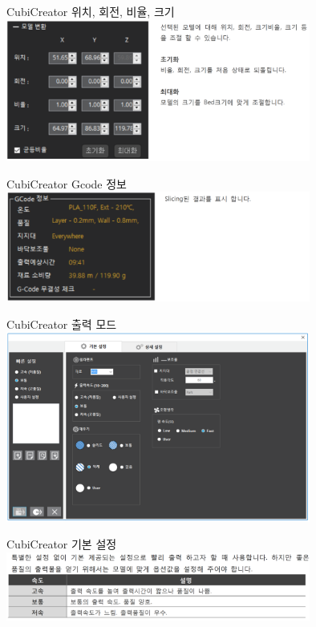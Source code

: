 \documentclass[11pt]{beamer}
\begin{document}
\begin{frame}[t]{CubiCreator 위치, 회전, 비율, 크기}\footnotesize
	\centering
	\includegraphics[width=10cm]{./image/18_29.png}
\end{frame}

\begin{frame}[t]{CubiCreator Gcode 정보}\footnotesize
	\centering
	\includegraphics[width=10cm]{./image/18_30.png}
\end{frame}

\begin{frame}[t]{CubiCreator 출력 모드 }\footnotesize
	\centering
	\includegraphics[width=10cm]{./image/18_31.png}
\end{frame}

\begin{frame}[t]{CubiCreator 기본 설정}\footnotesize
	\centering
	\includegraphics[width=10cm]{./image/18_32.png}
\end{frame}
\end{document}
